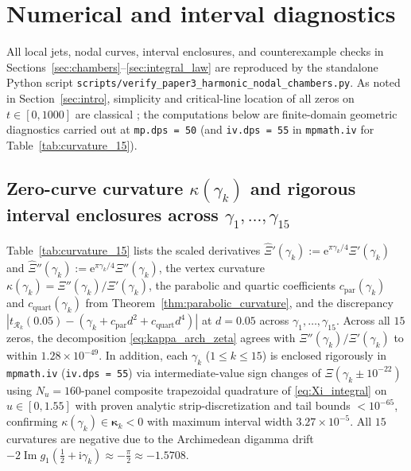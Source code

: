 \documentclass[11pt,a4paper,reqno]{amsart}
\theoremstyle{definition}
\theoremstyle{remark}
\numberwithin{equation}{section}
\newcommand{\ii}{\mathrm{i}}
\newcommand{\ee}{\mathrm{e}}
\newcommand{\Ima}{\operatorname{Im}}
\begin{document}
\section{Numerical and interval diagnostics}\label{sec:numerics}

All local jets, nodal curves, interval enclosures, and counterexample checks in Sections~\ref{sec:chambers}--\ref{sec:integral_law} are reproduced by the standalone Python script \nolinkurl{scripts/verify_paper3_harmonic_nodal_chambers.py}. As noted in Section~\ref{sec:intro}, simplicity and critical-line location of all zeros on $t \in [0, 1000]$ are classical \cite{Gram1903,TitchmarshComrie1936,PlattTrudgian2021}; the computations below are finite-domain geometric diagnostics carried out at \texttt{mp.dps = 50} (and \texttt{iv.dps = 55} in \texttt{mpmath.iv} for Table~\ref{tab:curvature_15}).

\subsection{Zero-curve curvature \texorpdfstring{$\kappa(\gamma_k)$}{kappa(gamma\_k)} and rigorous interval enclosures across \texorpdfstring{$\gamma_1,\dots,\gamma_{15}$}{gamma\_1..gamma\_15}}\label{subsec:num_curvature}

Table~\ref{tab:curvature_15} lists the scaled derivatives $\widehat{\Xi}'(\gamma_k) := \ee^{\pi\gamma_k/4}\Xi'(\gamma_k)$ and $\widehat{\Xi}''(\gamma_k) := \ee^{\pi\gamma_k/4}\Xi''(\gamma_k)$, the vertex curvature $\kappa(\gamma_k) = \Xi''(\gamma_k)/\Xi'(\gamma_k)$, the parabolic and quartic coefficients $c_{\mathrm{par}}(\gamma_k)$ and $c_{\mathrm{quart}}(\gamma_k)$ from Theorem~\ref{thm:parabolic_curvature}, and the discrepancy $|t_{\mathcal{R}_k}(0.05) - (\gamma_k + c_{\mathrm{par}}d^2 + c_{\mathrm{quart}}d^4)|$ at $d = 0.05$ across $\gamma_1,\dots,\gamma_{15}$. Across all $15$ zeros, the decomposition \eqref{eq:kappa_arch_zeta} agrees with $\Xi''(\gamma_k)/\Xi'(\gamma_k)$ to within $1.28 \times 10^{-49}$. In addition, each $\gamma_k$ ($1 \le k \le 15$) is enclosed rigorously in \texttt{mpmath.iv} (\texttt{iv.dps = 55}) via intermediate-value sign changes of $\Xi(\gamma_k \pm 10^{-22})$ using $N_u = 160$-panel composite trapezoidal quadrature of \eqref{eq:Xi_integral} on $u \in [0, 1.55]$ with proven analytic strip-discretization and tail bounds $< 10^{-65}$, confirming $\kappa(\gamma_k) \in \boldsymbol{\kappa}_k < 0$ with maximum interval width $3.27 \times 10^{-5}$. All $15$ curvatures are negative due to the Archimedean digamma drift $-2\Ima g_1(\frac{1}{2}+\ii\gamma_k) \approx -\frac{\pi}{2} \approx -1.5708$.
\end{document}
